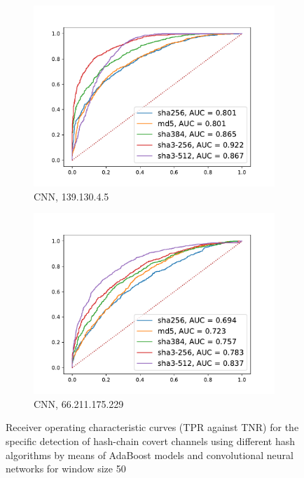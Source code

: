 \documentclass[12pt,a4paper,automark, toc=bib]{scrreprt}
\theoremstyle{definition}
\begin{document}
\begin{figure}
\begin{subfigure}{0.32\linewidth}
					\includegraphics[width=\linewidth]{figures/139.130.4.5_50_keras.pdf}
					\caption{CNN, 139.130.4.5}
				\end{subfigure}
				\begin{subfigure}{0.32\linewidth}
					\centering
					\includegraphics[width=\linewidth]{figures/66.211.175.229_50_keras.pdf}
					\caption{CNN, 66.211.175.229}
				\end{subfigure}
			\begin{subfigure}{0.32\linewidth}
				\hphantom{a}
			\end{subfigure}
			\caption{Receiver operating characteristic curves (TPR against TNR) for the specific detection of hash-chain covert channels using different hash algorithms by means of AdaBoost models and convolutional neural networks for window size 50}
			\label{hash-roc}
			\end{figure}
\end{document}
